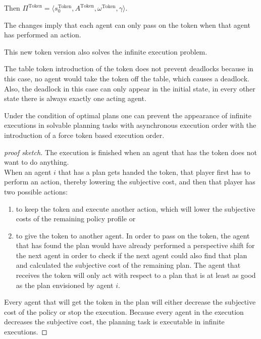 Then $ \Pi^{\text{Token}} = \langle s_0^{\text{Token}}, A ^{\text{Token}}, \omega ^{\text{Token}}, \gamma \rangle $.

The changes imply that each agent can only pass on the token when that agent has performed an action.

This new token version also solves the infinite execution problem.

The table token introduction of the token does not prevent deadlocks because in this case, no agent would take the token off the table, which causes a deadlock. Also, the deadlock in this case can only appear in the initial state, in every other state there is always exactly one acting agent.

\begin{theorem}
  Under the condition of optimal plans one can prevent the appearance of infinite executions in solvable planning tasks with asynchronous execution order with the introduction of a force token based execution order.
\end{theorem}



\begin{proof}[proof sketch]
  The execution is finished when an agent that has the token does not want to do anything. \\
  When an agent $i$ that has a plan gets handed the token, that player first has to perform an action, thereby lowering the subjective cost, and then that player has two possible actions:
  \begin{enumerate}
    \item to keep the token and execute another action, which will lower the subjective costs of the remaining policy profile or
    \item to give the token to another agent. In order to pass on the token, the agent that has found the plan would have already performed a perspective shift for the next agent in order to check if the next agent could also find that plan and calculated the subjective cost of the remaining plan. The agent that receives the token will only act with respect to a plan that is at least as good as the plan envisioned by agent $i$.
  \end{enumerate}
  Every agent that will get the token in the plan will either decrease the subjective cost of the policy or stop the execution. Because every agent in the execution decreases the subjective cost, the planning task is executable in infinite executions.
\end{proof}

